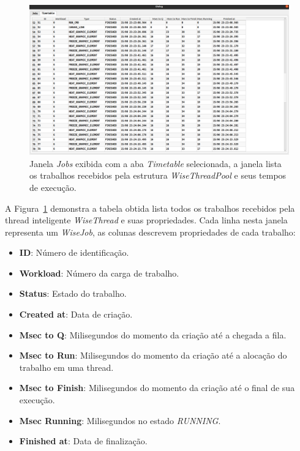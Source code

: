 \begin{figure}[!htbp]
	\centering
	\includegraphics[width=\linewidth]{Figures/IGU_023.png}
	\caption{Janela \textit{Jobs} exibida com a aba \textit{Timetable} selecionada, a janela lista os trabalhos recebidos pela estrutura \textit{WiseThreadPool} e seus tempos de execução.}
	\label{fig:jobs}
\end{figure}

A Figura~\ref{fig:jobs} demonstra a tabela obtida lista todos os trabalhos recebidos pela thread inteligente \textit{WiseThread} e suas propriedades. Cada linha nesta janela representa um \textit{WiseJob}, as colunas descrevem propriedades de cada trabalho:

\begin{itemize}
	\item \textbf{ID}: Número de identificação.
	\item \textbf{Workload}: Número da carga de trabalho.
	\item \textbf{Status}: Estado do trabalho.
	\item \textbf{Created at}: Data de criação.
	\item \textbf{Msec to Q}: Milisegundos do momento da criação até a chegada a fila.
	\item \textbf{Msec to Run}: Milisegundos do momento da criação até a alocação do trabalho em uma thread.
	\item \textbf{Msec to Finish}: Milisegundos do momento da criação até o final de sua execução.
	\item \textbf{Msec Running}: Milisegundos no estado \textit{RUNNING}.
	\item \textbf{Finished at}: Data de finalização.
\end{itemize}

